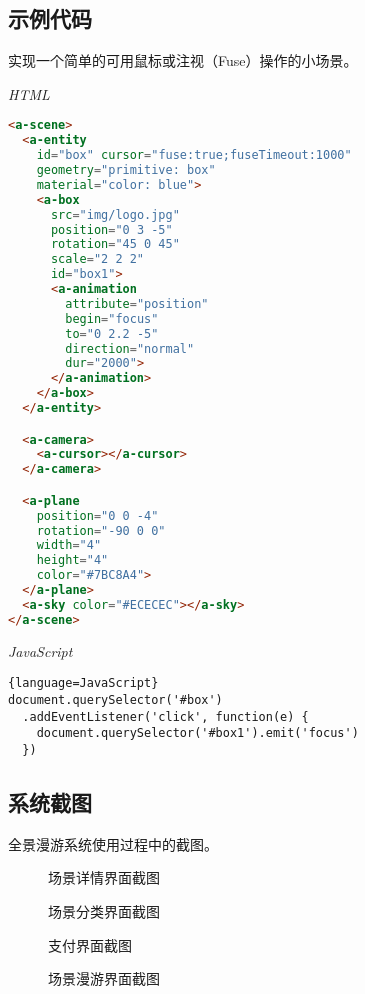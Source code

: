 \subsection{示例代码}
实现一个简单的可用鼠标或注视（Fuse）操作的小场景。

\emph{HTML}
\begin{lstlisting}[language=HTML]
<a-scene>
  <a-entity
    id="box" cursor="fuse:true;fuseTimeout:1000"
    geometry="primitive: box"
    material="color: blue">
    <a-box
      src="img/logo.jpg"
      position="0 3 -5"
      rotation="45 0 45"
      scale="2 2 2"
      id="box1">
      <a-animation
        attribute="position"
        begin="focus"
        to="0 2.2 -5"
        direction="normal"
        dur="2000">
      </a-animation>
    </a-box>
  </a-entity>

  <a-camera>
    <a-cursor></a-cursor>
  </a-camera>

  <a-plane 
    position="0 0 -4" 
    rotation="-90 0 0" 
    width="4" 
    height="4" 
    color="#7BC8A4">
  </a-plane>
  <a-sky color="#ECECEC"></a-sky>
</a-scene>
\end{lstlisting} 

\emph{JavaScript}
\begin{lstlisting}{language=JavaScript}
document.querySelector('#box')
  .addEventListener('click', function(e) {
    document.querySelector('#box1').emit('focus')
  })
\end{lstlisting}

\subsection{系统截图}
全景漫游系统使用过程中的截图。

\begin{figure}[htp]
\centering
{}
\caption{场景详情界面截图}
\label{fig:app1}
\end{figure}

\begin{figure}[htp]
\centering
{}
\caption{场景分类界面截图}
\label{fig:app4}
\end{figure}

\begin{figure}[htp]
\centering
{}
\caption{支付界面截图}
\label{fig:app2}
\end{figure}

\begin{figure}[htp]
\centering
{}
\caption{场景漫游界面截图}
\label{fig:app3}
\end{figure}